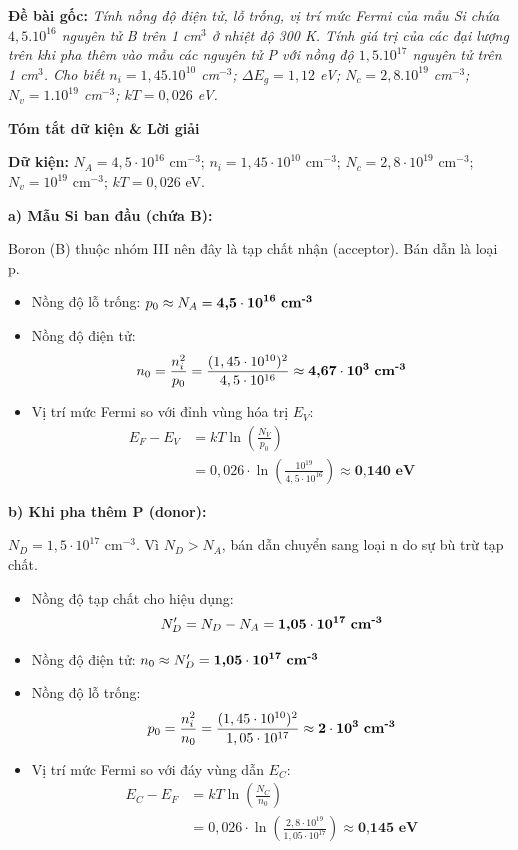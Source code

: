 \documentclass[11pt,a4paper,twocolumn]{article}
\begin{document}
\textbf{Đề bài gốc:} \textit{Tính nồng độ điện tử, lỗ trống, vị trí mức Fermi của mẫu Si chứa $4,5.10^{16}$ nguyên tử B trên 1 cm$^3$ ở nhiệt độ 300 K. Tính giá trị của các đại lượng trên khi pha thêm vào mẫu các nguyên tử P với nồng độ $1,5.10^{17}$ nguyên tử trên 1 cm$^3$. Cho biết $n_i = 1,45.10^{10}$ cm$^{-3}$; $\Delta E_g = 1,12$ eV; $N_c = 2,8.10^{19}$ cm$^{-3}$; $N_v = 1.10^{19}$ cm$^{-3}$; $kT = 0,026$ eV.}

\textbf{Tóm tắt dữ kiện \& Lời giải}

\textbf{Dữ kiện:} $N_A = 4,5 \cdot 10^{16}$ cm$^{-3}$; $n_i = 1,45 \cdot 10^{10}$ cm$^{-3}$; $N_c = 2,8 \cdot 10^{19}$ cm$^{-3}$; $N_v = 10^{19}$ cm$^{-3}$; $kT = 0,026$ eV.

\textbf{a) Mẫu Si ban đầu (chứa B):}

Boron (B) thuộc nhóm III nên đây là tạp chất nhận (acceptor). Bán dẫn là loại p.
\begin{itemize}[leftmargin=*, topsep=0pt, itemsep=0pt]
    \item Nồng độ lỗ trống: $p_0 \approx N_A = \textbf{4,5} \cdot \textbf{10}^{\textbf{16}} \text{ \textbf{cm}}^{\textbf{-3}}$
    \item Nồng độ điện tử: 
    $$n_0 = \frac{n_i^2}{p_0} = \frac{(1,45 \cdot 10^{10})^2}{4,5 \cdot 10^{16}} \approx \textbf{4,67} \cdot \textbf{10}^{\textbf{3}} \text{ \textbf{cm}}^{\textbf{-3}}$$
    \item Vị trí mức Fermi so với đỉnh vùng hóa trị $E_V$:
    \begin{align*}
        E_F - E_V &= kT \ln \left( \frac{N_V}{p_0} \right) \\
        &= 0,026 \cdot \ln \left( \frac{10^{19}}{4,5 \cdot 10^{16}} \right) \approx \textbf{0,140 eV}
    \end{align*}
\end{itemize}

\textbf{b) Khi pha thêm P (donor):}

$N_D = 1,5 \cdot 10^{17}$ cm$^{-3}$. Vì $N_D > N_A$, bán dẫn chuyển sang loại n do sự bù trừ tạp chất.
\begin{itemize}[leftmargin=*, topsep=0pt, itemsep=0pt]
    \item Nồng độ tạp chất cho hiệu dụng: 
    $$N_D' = N_D - N_A = \textbf{1,05} \cdot \textbf{10}^{\textbf{17}} \text{ \textbf{cm}}^{\textbf{-3}}$$
    \item Nồng độ điện tử: $n_0 \approx N_D' = \textbf{1,05} \cdot \textbf{10}^{\textbf{17}} \text{ \textbf{cm}}^{\textbf{-3}}$
    \item Nồng độ lỗ trống: 
    $$p_0 = \frac{n_i^2}{n_0} = \frac{(1,45 \cdot 10^{10})^2}{1,05 \cdot 10^{17}} \approx \textbf{2} \cdot \textbf{10}^{\textbf{3}} \text{ \textbf{cm}}^{\textbf{-3}}$$
    \item Vị trí mức Fermi so với đáy vùng dẫn $E_C$:
    \begin{align*}
        E_C - E_F &= kT \ln \left( \frac{N_C}{n_0} \right) \\
        &= 0,026 \cdot \ln \left( \frac{2,8 \cdot 10^{19}}{1,05 \cdot 10^{17}} \right) \approx \textbf{0,145 eV}
    \end{align*}
\end{itemize}
\end{document}
